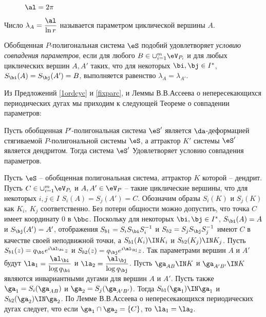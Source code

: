 \begin{figure}[h!]
\centering
{}
\caption{$\al=2\pi$}%
\label{cntrex}%
\end{figure}

\begin{definition}
Число $\lambda_A=\dfrac{\al}{\ln{r}}$ называется параметром циклической вершины $A$.
\end{definition}

\begin{definition}
Обобщенная $P$-полигональная система $\eS$ подобий удовлетворяет {\em условию совпадения параметров}, если для любого $B \in\cup_{i=1}^m  \eV_{P_i}$ и для любых циклических вершин $A,A'$  таких, что для некоторых $\bi,\bj\in I^*$,  $S_\bi(A)=S_\bj(A')=B$, выполняется равенство $\lambda _{A}=\lambda _{A'}$.
\end{definition}

Из Предложений \ref{1ordcyc} и \ref{fixparc}, и Леммы В.В.Ассеева о непересекающихся периодических дугах \cite[Lemma 3.1]{ATK} мы приходим к следующей Теореме о совпадении параметров:

\begin{theorem}\label{PMT}
Пусть обобщенная $P'$-полигональная система $\eS'$ является  $\da$-деформацией стягиваемой $P$-полигональной системы  $\eS$, а аттрактор $K'$ системы $\eS'$ является дендритом. Тогда система $\eS'$ Удовлетворяет условию совпадения параметров.
\end{theorem}

\dok Пусть $\eS$ -- обобщенная полигональная система, аттрактор $K$ которой -- дендрит. Пусть $C \in\cup_{i=1}^m  \eV_{P_i}$ и $A,A'\in \eV_P$ -- такие циклические вершины, что для некоторых $i,j\in I$  $S_i(A)=S_j(A')=C$. Обозначим образы $S_i(K)$ и $S_j(K)$ как $K_i,\ K_j$ соответственно. Без потери общности можно допустить, что точка $C$ имеет координату $0$ в $\bbc$. Поскольку для некоторых $\bi,\bj\in I^*$, $S_\bi(A)=A$ и $S_\bj(A')=A'$, отображения $S_{b1}=S_iS_\bi S_i^{-1}$ и $S_{b2}=S_jS_\bj S_j^{-1}$ имеют $C$  в качестве своей неподвижной точки, а $S_{b1}(K_i)\IN K_i$ и $S_{b2}(K_j)\IN K_j$. Пусть $S_{b1}(z)=q_\bi e^{i\al_\bi}z$ и $S_{b2}(z)=q_\bj e^{i\al_\bj}z$. Так параметрами вершин $A$ и $A'$ будут $\la_1=\dfrac{\al_\bi}{\log q_\bi}$ и  $\la_2=\dfrac{\al_\bj}{\log q_\bj}$. Пусть $\ga_{AB}\IN K$ и $\ga_{A'B'}\IN K$ являются инвариантными дугами для вершин $A$ и $A'$. Пусть также  $\ga_1=S_i(\ga_{AB})$ и $\ga_2=S_j(\ga_{A'B'})$. Тогда $S_{b1}(\ga_1)\IN \ga_1$ и $S_{b2}(\ga_2)\IN \ga_2$. По Лемме В.В.Ассеева о непересекающихся периодических дугах \cite[Lemma 3.1]{ATK} следует, что если $\ga_1\cap\ga_2=\{C\}$, то $\la_1=\la_2$.\vse\\

